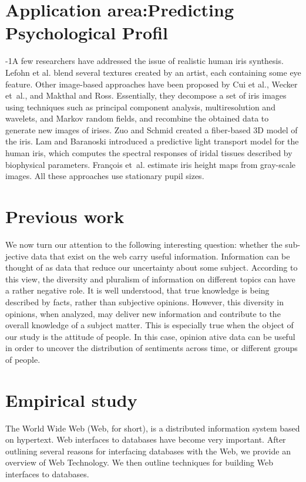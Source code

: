 \documentclass{acmtog} %
\begin{document}
\section{Application area:Predicting Psychological Profil}
\label{sec:application area}
%
\looseness-1A few researchers have addressed the issue of realistic
human iris synthesis. Lefohn et al. blend several textures created by an
artist, each containing some eye feature. Other image-based approaches
have been proposed by Cui et al., Wecker et~al., and Makthal and Ross.
Essentially, they decompose a set of iris images using techniques such
as principal component analysis, multiresolution and wavelets, and
Markov random fields, and recombine the obtained data to generate new
images of irises. Zuo and Schmid created a fiber-based 3D model of the
iris. Lam and Baranoski introduced a predictive light transport model
for the human iris, which computes the spectral responses of iridal
tissues described by biophysical parameters. Fran\c{c}ois et~al.
estimate iris height maps from gray-scale images. All these approaches
use stationary pupil sizes.

\section{Previous work}
\label{sec:previous review}

We now turn our attention to the following interesting question: whether the sub-jective data that exist on the web carry useful information. Information can be thought of as data that reduce our uncertainty about some subject. According to this view, the diversity and pluralism of information on different topics can have a rather negative role. It is well understood, that true knowledge is being described by facts, rather than subjective opinions. However, this diversity in opinions, when analyzed, may deliver new information and contribute to the overall knowledge of a subject matter. This is especially true when the object of our study is the attitude of people. In this case, opinion ative data can be useful in order to uncover the distribution of sentiments across time, or different groups of people.

\section{Empirical study}
\label{sub:empirical}

The World Wide Web (Web, for short), is a distributed information system based on hypertext. Web interfaces to databases have become very important. After outlining several reasons for interfacing databases with the Web, we provide an overview of Web Technology. We then outline techniques for building Web interfaces to databases.
\end{document}
